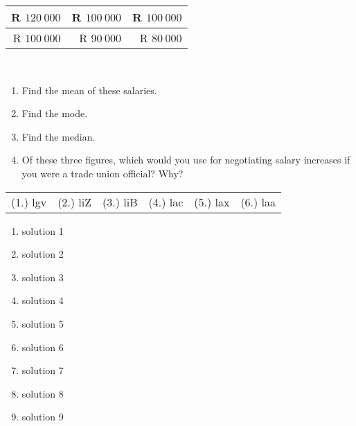 \begin{eocexercises}{}
\begin{enumerate}[itemsep=6pt, label=\textbf{\arabic*}.]
\begin{center}
\begin{tabular}{|r|r|r|}
        R $120 ~000 $& R $100~ 000$ & R $100 ~000$ \\\hline
        R $100 ~000$ & R  $90~ 000$ & R  $80 ~000$ \\\hline
      \end{tabular}
    \end{center}
\vspace {8pt}\\
    \begin{enumerate}[noitemsep, label=\textbf{(\alph*)} ]
    \item Find the mean of these salaries.
    \item Find the mode.
    \item Find the median.
    \item Of these three figures, which would you use for
      negotiating salary increases if you were a trade union
      official? Why?
    \end{enumerate}
  \end{enumerate}
\practiceinfo
\par 
\par \begin{tabular}[h]{cccccc}
(1.) lgv  &  (2.) liZ  &  (3.) liB  &  (4.) lac  &  (5.) lax  &  (6.) laa \end{tabular}
\end{eocexercises}


 \begin{solutions}{}{
\begin{enumerate}[itemsep=5pt, label=\textbf{\arabic*}. ] 


\item solution 1
\item solution 2
\item solution 3
\item solution 4
\item solution 5
\item solution 6
\item solution 7
\item solution 8
\item solution 9

\end{enumerate}}
\end{solutions}


